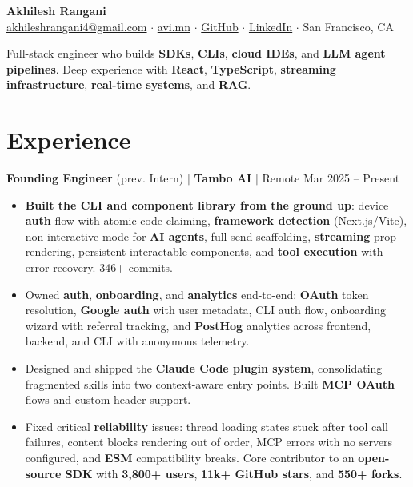 \documentclass[10pt,a4paper]{article}
\begin{document}
\begin{center}
    {\Large \textbf{Akhilesh Rangani}} \\[2pt]
    \small
    \href{mailto:akhileshrangani4@gmail.com}{akhileshrangani4@gmail.com} $\cdot$
    \href{https://avi.mn}{avi.mn} $\cdot$
    \href{https://github.com/akhileshrangani4}{GitHub} $\cdot$
    \href{https://linkedin.com/in/akhileshrangani}{LinkedIn} $\cdot$
    San Francisco, CA
\end{center}

\vspace{-2pt}
\small
Full-stack engineer who builds \textbf{SDKs}, \textbf{CLIs}, \textbf{cloud IDEs}, and \textbf{LLM agent pipelines}. Deep experience with \textbf{React}, \textbf{TypeScript}, \textbf{streaming infrastructure}, \textbf{real-time systems}, and \textbf{RAG}.

\section{Experience}

\textbf{Founding Engineer} (prev. Intern) $|$ \textbf{Tambo AI} $|$ Remote \hfill Mar 2025 -- Present
\begin{itemize}
    \item \textbf{Built the CLI and component library from the ground up}: device \textbf{auth} flow with atomic code claiming, \textbf{framework detection} (Next.js/Vite), non-interactive mode for \textbf{AI agents}, full-send scaffolding, \textbf{streaming} prop rendering, persistent interactable components, and \textbf{tool execution} with error recovery. 346+ commits.
    \item Owned \textbf{auth}, \textbf{onboarding}, and \textbf{analytics} end-to-end: \textbf{OAuth} token resolution, \textbf{Google auth} with user metadata, CLI auth flow, onboarding wizard with referral tracking, and \textbf{PostHog} analytics across frontend, backend, and CLI with anonymous telemetry.
    \item Designed and shipped the \textbf{Claude Code plugin system}, consolidating fragmented skills into two context-aware entry points. Built \textbf{MCP OAuth} flows and custom header support.
    \item Fixed critical \textbf{reliability} issues: thread loading states stuck after tool call failures, content blocks rendering out of order, MCP errors with no servers configured, and \textbf{ESM} compatibility breaks. Core contributor to an \textbf{open-source SDK} with \textbf{3,800+ users}, \textbf{11k+ GitHub stars}, and \textbf{550+ forks}.
\end{itemize}
\end{document}
